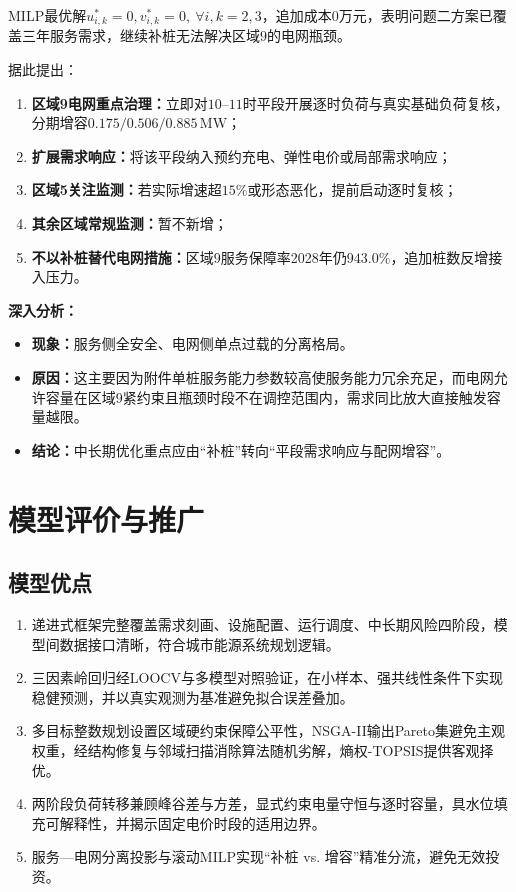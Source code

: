 \documentclass[a4paper,12pt]{ctexart}
\begin{document}
MILP最优解$u_{i,k}^{*}=0,v_{i,k}^{*}=0,\ \forall i,k=2,3$，追加成本$0$万元，表明问题二方案已覆盖三年服务需求，继续补桩无法解决区域$9$的电网瓶颈。

据此提出：
\begin{enumerate}[label=\arabic*.]
\item \textbf{区域9电网重点治理：}立即对$10\text{--}11$时平段开展逐时负荷与真实基础负荷复核，分期增容$0.175/0.506/0.885\,\mathrm{MW}$；
\item \textbf{扩展需求响应：}将该平段纳入预约充电、弹性电价或局部需求响应；
\item \textbf{区域5关注监测：}若实际增速超$15\%$或形态恶化，提前启动逐时复核；
\item \textbf{其余区域常规监测：}暂不新增；
\item \textbf{不以补桩替代电网措施：}区域$9$服务保障率2028年仍$943.0\%$，追加桩数反增接入压力。
\end{enumerate}

\textbf{深入分析：}
\begin{itemize}
\item \textbf{现象：}服务侧全安全、电网侧单点过载的分离格局。
\item \textbf{原因：}这主要因为附件单桩服务能力参数较高使服务能力冗余充足，而电网允许容量在区域$9$紧约束且瓶颈时段不在调控范围内，需求同比放大直接触发容量越限。
\item \textbf{结论：}中长期优化重点应由“补桩”转向“平段需求响应与配网增容”。
\end{itemize}

\section{模型评价与推广}
\subsection{模型优点}
\begin{enumerate}[label=\arabic*.]
\item 递进式框架完整覆盖需求刻画、设施配置、运行调度、中长期风险四阶段，模型间数据接口清晰，符合城市能源系统规划逻辑。
\item 三因素岭回归经LOOCV与多模型对照验证，在小样本、强共线性条件下实现稳健预测，并以真实观测为基准避免拟合误差叠加。
\item 多目标整数规划设置区域硬约束保障公平性，NSGA-II输出Pareto集避免主观权重，经结构修复与邻域扫描消除算法随机劣解，熵权-TOPSIS提供客观择优。
\item 两阶段负荷转移兼顾峰谷差与方差，显式约束电量守恒与逐时容量，具水位填充可解释性，并揭示固定电价时段的适用边界。
\item 服务—电网分离投影与滚动MILP实现“补桩 vs. 增容”精准分流，避免无效投资。
\end{enumerate}
\end{document}
